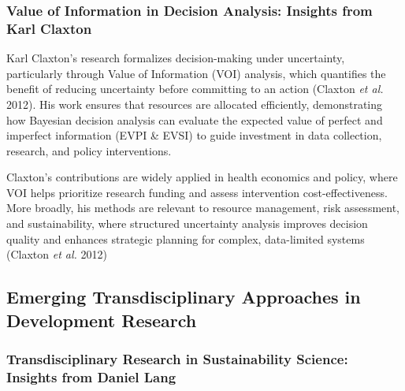 \documentclass[
]{article}
\begin{document}
\hypertarget{value-of-information-in-decision-analysis-insights-from-karl-claxton}{%
\subsubsection*{Value of Information in Decision Analysis: Insights from
Karl
Claxton}\label{value-of-information-in-decision-analysis-insights-from-karl-claxton}}

Karl Claxton's research formalizes decision-making under uncertainty,
particularly through Value of Information (VOI) analysis, which
quantifies the benefit of reducing uncertainty before committing to an
action (Claxton \emph{et al.} 2012). His work ensures that resources are
allocated efficiently, demonstrating how Bayesian decision analysis can
evaluate the expected value of perfect and imperfect information (EVPI
\& EVSI) to guide investment in data collection, research, and policy
interventions.

Claxton's contributions are widely applied in health economics and
policy, where VOI helps prioritize research funding and assess
intervention cost-effectiveness. More broadly, his methods are relevant
to resource management, risk assessment, and sustainability, where
structured uncertainty analysis improves decision quality and enhances
strategic planning for complex, data-limited systems (Claxton \emph{et
al.} 2012)

\hypertarget{emerging-transdisciplinary-approaches-in-development-research}{%
\subsection*{Emerging Transdisciplinary Approaches in Development
Research}\label{emerging-transdisciplinary-approaches-in-development-research}}

\hypertarget{transdisciplinary-research-in-sustainability-science-insights-from-daniel-lang}{%
\subsubsection*{Transdisciplinary Research in Sustainability Science:
Insights from Daniel
Lang}\label{transdisciplinary-research-in-sustainability-science-insights-from-daniel-lang}}
\end{document}
